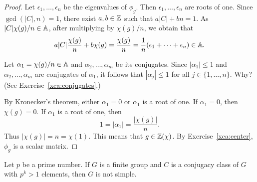  \begin{proof}
	Let $\epsilon_1,\dots,\epsilon_n$ be the eigenvalues of $\phi_g$. Then 
    $\epsilon_1,\dots,\epsilon_n$ are roots of one. 
    Since  
	$\gcd(|C|,n)=1$, there exist $a,b\in\mathbb{Z}$ such that $a|C|+bn=1$. As  
	$|C|\chi(g)/n\in\mathbb{A}$, after multiplying by $\chi(g)/n$, we obtain that  
	\[
		a|C|\frac{\chi(g)}{n}+b\chi(g)=\frac{\chi(g)}{n}=\frac{1}{n}(\epsilon_1+\cdots+\epsilon_n)\in\mathbb{A}.
	\]
    
    Let $\alpha_1=\chi(g)/n\in\mathbb{A}$ and $\alpha_2,\dots,\alpha_m$ be its conjugates. Since $|\alpha_1|\leq 1$ 
    and $\alpha_2,\dots,\alpha_m$ are conjugates of $\alpha_1$, it follows that  
    $|\alpha_j|\leq 1$ for all $j\in\{1,\dots,n\}$. Why? (See Exercise~\ref{xca:conjugates}.)
    
    By Kronecker's theorem, 
    either $\alpha_1=0$ or $\alpha_1$ is a root of one. If $\alpha_1=0$, then $\chi(g)=0$. If 
    $\alpha_1$ is a root of one, then 
    \[
    1=|\alpha_1|=\frac{|\chi(g)|}{n}.
    \]
    Thus $|\chi(g)|=n=\chi(1)$. This means that $g\in\mathbb{Z}(\chi)$. By Exercise~\ref{xca:center}, 
    $\phi_g$ is a scalar matrix. 
\end{proof}

\begin{theorem}[Burnside]
    \label{thm:pq_notsimple}
	Let $p$ be a prime number. If $G$ is a finite group and 
	$C$ is a conjugacy class of $G$ with $p^k>1$ elements, then $G$ 
	is not simple.
\end{theorem}

